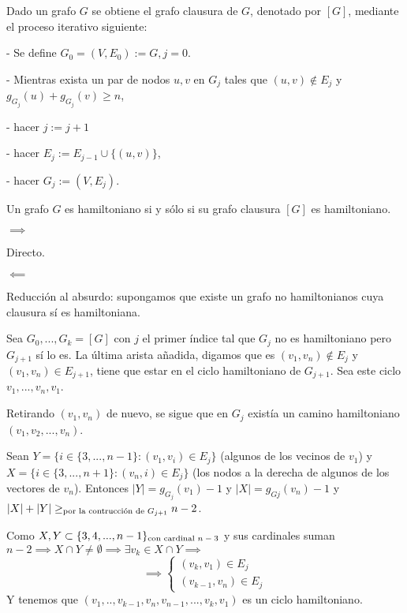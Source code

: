 \documentclass[openany]{book}
\begin{document}
Dado un grafo $G$ se obtiene el grafo clausura de $G$, denotado por $[G]$, mediante el proceso iterativo siguiente:

- Se define $G_{0}=\left(V, E_{0}\right):=G, j=0$.

- Mientras exista un par de nodos $u, v$ en $G_{j}$ tales que $(u, v) \notin E_{j}$ y $g_{G_{j}}(u)+g_{G_{j}}(v) \geq n$,

- hacer $j:=j+1$

- hacer $E_{j}:=E_{j-1} \cup\{(u, v)\}$,

- hacer $G_{j}:=\left(V, E_{j}\right)$.

\begin{theorem}
  Un grafo $G$ es hamiltoniano si y sólo si su grafo clausura $[G]$ es hamiltoniano.
\end{theorem}


\begin{demonstration}

    $ \implies $

    Directo.

    $ \impliedby $

    Reducción al absurdo: supongamos que existe un grafo no hamiltonianos cuya clausura sí es hamiltoniana.

    Sea $ G_0,...,G_k = [G] $ con $ j $ el primer índice tal que $ G_{j} $ no es hamiltoniano pero $ G_{j+1} $ sí lo es. La última arista añadida, digamos que es $ (v_1,v_n) \not \in E_j $ y $ (v_1,v_n) \in E_{j+1} $, tiene que estar en el ciclo hamiltoniano de $ G_{j+1} $. Sea este ciclo $ v_1,...,v_n,v_1 $.

    Retirando $ (v_1,v_n) $ de nuevo, se sigue que en $ G_j $ existía un camino hamiltoniano $ (v_1,v_2,...,v_n) $.

    Sean $ Y = \{i \in \{3,...,n-1\} : (v_1,v_i) \in E_j\} $ (algunos de los vecinos de $ v_1 $) y $ X = \{i \in \{3,...,n+1\}:(v_n,i) \in E_j\} $ (los nodos a la derecha de algunos de los vectores de $ v_n $). Entonces $ |Y| = g_{G_j}(v_1) -1$ y $ |X| = g_{Gj}(v_n)-1 $ y $ |X| + |Y| \geq_{\text{por la contrucción de $ G_{j+1} $}} n-2  $.

    Como $ X,Y \subset \{3,4,...,n-1\}_{\text{con cardinal $ n-3 $}} $ y sus cardinales suman $ n-2 \implies X \cap Y \ne \emptyset \implies \exists v_{k} \in X \cap Y \implies $
    $$ \implies \left\{
    \begin{array}{l}
        (v_{k},v_1) \in E_j\\
        (v_{k-1},v_n) \in E_j
    \end{array}
    \right. $$
    Y tenemos que $ (v_1,..,v_{k-1},v_{n},v_{n-1},...,v_{k},v_{1}) $ es un ciclo hamiltoniano.
\end{demonstration}
\end{document}
